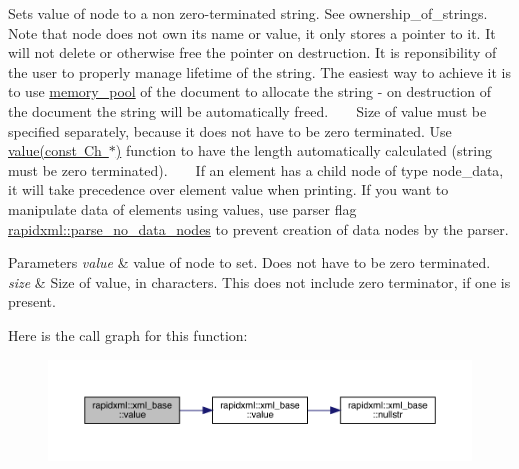 Sets value of node to a non zero-\/terminated string. See ownership\+\_\+of\+\_\+strings. ~\newline
~\newline
 Note that node does not own its name or value, it only stores a pointer to it. It will not delete or otherwise free the pointer on destruction. It is reponsibility of the user to properly manage lifetime of the string. The easiest way to achieve it is to use \mbox{\hyperlink{classrapidxml_1_1memory__pool}{memory\+\_\+pool}} of the document to allocate the string -\/ on destruction of the document the string will be automatically freed. ~\newline
~\newline
 Size of value must be specified separately, because it does not have to be zero terminated. Use \mbox{\hyperlink{classrapidxml_1_1xml__base_a81e63ec4bfd2d7ef0a6c2ed49be6e623}{value(const Ch $\ast$)}} function to have the length automatically calculated (string must be zero terminated). ~\newline
~\newline
 If an element has a child node of type node\+\_\+data, it will take precedence over element value when printing. If you want to manipulate data of elements using values, use parser flag \mbox{\hyperlink{namespacerapidxml_ac2d21ef14a4e8936b94aca5d38b1a74d}{rapidxml\+::parse\+\_\+no\+\_\+data\+\_\+nodes}} to prevent creation of data nodes by the parser.
\begin{DoxyParams}{Parameters}
{\em value} & value of node to set. Does not have to be zero terminated.\\
\hline
{\em size} & Size of value, in characters. This does not include zero terminator, if one is present. \\
\hline
\end{DoxyParams}
Here is the call graph for this function\+:\nopagebreak
\begin{figure}[H]
\begin{center}
\leavevmode
\includegraphics[width=350pt]{classrapidxml_1_1xml__base_a3b183c2db7022a6d30494dd2f0ac11e9_cgraph}
\end{center}
\end{figure}
\mbox{\label{classrapidxml_1_1xml__base_a81e63ec4bfd2d7ef0a6c2ed49be6e623}} 
